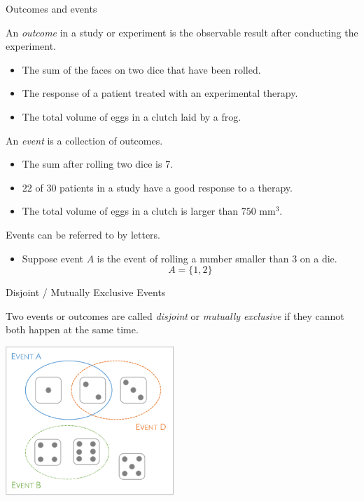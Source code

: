 \documentclass[ignorenonframetext,aspectratio=169]{beamer}
\providecommand{\tightlist}{%
  \setlength{\itemsep}{0pt}\setlength{\parskip}{0pt}}
\begin{document}
\begin{frame}{Outcomes and events}

An \emph{outcome} in a study or experiment is the observable result
after conducting the experiment.

\begin{itemize}
\item
  The sum of the faces on two dice that have been rolled.
\item
  The response of a patient treated with an experimental therapy.
\item
  The total volume of eggs in a clutch laid by a frog.
\end{itemize}

An \emph{event} is a collection of outcomes.

\begin{itemize}
\item
  The sum after rolling two dice is 7.
\item
  22 of 30 patients in a study have a good response to a therapy.
\item
  The total volume of eggs in a clutch is larger than
  \(750 \text{ mm}^3\).
\end{itemize}

Events can be referred to by letters.

\begin{itemize}
\tightlist
\item
  Suppose event \(A\) is the event of rolling a number smaller than 3 on
  a die. \[A = \{1, 2 \} \]
\end{itemize}

\end{frame}

\begin{frame}{Disjoint / Mutually Exclusive Events}

Two events or outcomes are called \emph{disjoint} or \emph{mutually
exclusive} if they cannot both happen at the same time.

\begin{center}
\includegraphics[width=2.5in]{figures/disjointEvents.png}
\end{center}

\end{frame}
\end{document}
